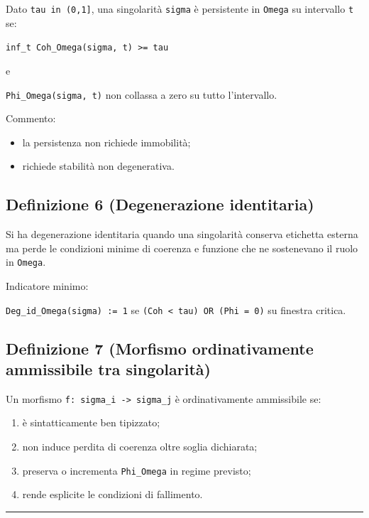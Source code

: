 Dato \texttt{tau\ in\ (0,1{]}}, una singolarità \texttt{sigma} è persistente in \texttt{Omega} su intervallo \texttt{t} se:

\texttt{inf\_t\ Coh\_Omega(sigma,\ t)\ \textgreater{}=\ tau}

e

\texttt{Phi\_Omega(sigma,\ t)} non collassa a zero su tutto l'intervallo.

Commento:

\begin{itemize}
\tightlist
\item
  la persistenza non richiede immobilità;
\item
  richiede stabilità non degenerativa.
\end{itemize}

\subsection{Definizione 6 (Degenerazione identitaria)}

Si ha degenerazione identitaria quando una singolarità conserva etichetta esterna ma perde le condizioni minime di coerenza e funzione che ne sostenevano il ruolo in \texttt{Omega}.

Indicatore minimo:

\texttt{Deg\_id\_Omega(sigma)\ :=\ 1} se \texttt{(Coh\ \textless{}\ tau)\ OR\ (Phi\ =\ 0)} su finestra critica.

\subsection{Definizione 7 (Morfismo ordinativamente ammissibile tra singolarità)}

Un morfismo \texttt{f:\ sigma\_i\ -\textgreater{}\ sigma\_j} è ordinativamente ammissibile se:

\begin{enumerate}
\def\labelenumi{\arabic{enumi}.}
\tightlist
\item
  è sintatticamente ben tipizzato;
\item
  non induce perdita di coerenza oltre soglia dichiarata;
\item
  preserva o incrementa \texttt{Phi\_Omega} in regime previsto;
\item
  rende esplicite le condizioni di fallimento.
\end{enumerate}

\begin{center}\rule{0.5\linewidth}{0.5pt}\end{center}

